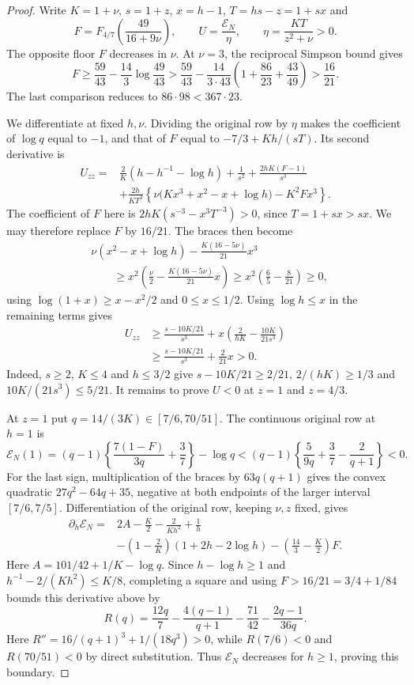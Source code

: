 \begin{proof}
Write $K=1+\nu$, $s=1+z$, $x=h-1$, $T=hs-z=1+sx$ and
\[
 F=F_{4/7}\left(\frac{49}{16+9\nu}\right),\qquad
 U=\frac{\mathcal E_N}{\eta},\qquad
 \eta=\frac{KT}{z^2+\nu}>0.
\]
The opposite floor $F$ decreases in $\nu$. At $\nu=3$, the reciprocal
Simpson bound gives
\[
 F\ge\frac{59}{43}-\frac{14}{3}\log\frac{49}{43}
 >\frac{59}{43}-\frac{14}{3\cdot43}
       \left(1+\frac{86}{23}+\frac{43}{49}\right)
 >\frac{16}{21}.
\]
The last comparison reduces to $86\cdot98<367\cdot23$.

We differentiate at fixed $h,\nu$. Dividing the original row by
$\eta$ makes the coefficient of $\log q$ equal to $-1$, and that
of $F$ equal to $-7/3+Kh/(sT)$. Its second derivative is
\begin{align*}
 U_{zz}={}&\frac2K\left(h-h^{-1}-\log h\right)+\frac1{s^2}
       +\frac{2hK(F-1)}{s^3}\\
 &+\frac{2h}{KT^3}
       \left\{\nu\bigl(Kx^3+x^2-x+\log h\bigr)-K^2Fx^3\right\}.
\end{align*}
The coefficient of $F$ here is
$2hK(s^{-3}-x^3T^{-3})>0$, since $T=1+sx>sx$.
We may therefore replace $F$ by $16/21$. The braces then become
\begin{align*}
 &\nu(x^2-x+\log h)-\frac{K(16-5\nu)}{21}x^3\\
 &\qquad\ge x^2\left(\frac\nu2-\frac{K(16-5\nu)}{21}x\right)
 \ge x^2\left(\frac65-\frac8{21}\right)\ge0,
\end{align*}
using $\log(1+x)\ge x-x^2/2$ and $0\le x\le1/2$.
Using $\log h\le x$ in the remaining terms gives
\begin{align*}
 U_{zz}
 &\ge\frac{s-10K/21}{s^3}
       +x\left(\frac2{hK}-\frac{10K}{21s^3}\right)\\
 &\ge\frac{s-10K/21}{s^3}+\frac2{21}x>0.
\end{align*}
Indeed, $s\ge2$, $K\le4$ and $h\le3/2$ give
$s-10K/21\ge2/21$, $2/(hK)\ge1/3$ and
$10K/(21s^3)\le5/21$. It remains to prove $U<0$ at $z=1$ and
$z=4/3$.

At $z=1$ put $q=14/(3K)\in[7/6,70/51]$.
The continuous original row at $h=1$ is
\[
 \mathcal E_N(1)
 =(q-1)\left\{\frac{7(1-F)}{3q}+\frac37\right\}-\log q
 <(q-1)\left\{\frac5{9q}+\frac37-\frac2{q+1}\right\}<0.
\]
For the last sign, multiplication of the braces by $63q(q+1)$ gives
the convex quadratic $27q^2-64q+35$, negative at both endpoints of
the larger interval $[7/6,7/5]$.
Differentiation of the original row, keeping $\nu,z$ fixed, gives
\begin{align*}
 \partial_h\mathcal E_N={}&2A-\frac K2-\frac2{Kh^2}+\frac1h\\
 &-\left(1-\frac2K\right)(1+2h-2\log h)
       -\left(\frac{14}3-\frac K2\right)F.
\end{align*}
Here $A=101/42+1/K-\log q$.
Since $h-\log h\ge1$ and
$h^{-1}-2/(Kh^2)\le K/8$, completing a square and using
$F>16/21=3/4+1/84$ bounds this derivative above by
\[
 R(q)=\frac{12q}7-\frac{4(q-1)}{q+1}-\frac{71}{42}
                       -\frac{2q-1}{36q}.
\]
Here $R''=16/(q+1)^3+1/(18q^3)>0$, while
$R(7/6)<0$ and $R(70/51)<0$ by direct substitution.
Thus $\mathcal E_N$ decreases for $h\ge1$, proving this boundary.


\end{proof}
